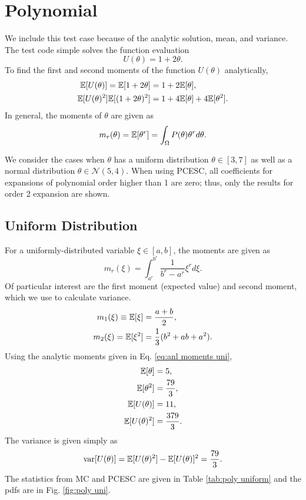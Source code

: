 \section{Polynomial}
We include this test case because of the analytic solution, mean, and variance.  The test code simple solves the function evaluation
\begin{equation}
U(\theta) = 1+2\theta.
\end{equation}
To find the first and second moments of the function $U(\theta)$ analytically,
\begin{align}
\mathbb{E}[ U(\theta)]=\mathbb{E}[ 1+2\theta]&=1+2\mathbb{E}[ \theta],\\
\mathbb{E}[ U(\theta)^2]\mathbb{E}[ (1+2\theta)^2]&=1+4\mathbb{E}[ \theta]+4\mathbb{E}[ \theta^2].
\end{align}
In general, the moments of $\theta$ are given as
\begin{equation}
m_r(\theta)=\mathbb{E}[ \theta^r]=\int_\Omega P(\theta)\theta^r d\theta.
\end{equation}

We consider the cases when $\theta$ has a uniform distribution $\theta\in[3,7]$ as well as a normal distribution $\theta\in\mathcal{N}(5,4)$.  When using PCESC, all coefficients for expansions of polynomial order higher than 1 are zero; thus, only the results for order 2 expansion are shown.

\subsection{Uniform Distribution}
For a uniformly-distributed variable $\xi\in[a,b]$, the moments are given as
\begin{equation}
m_r(\xi)=\int_{a^r}^{b^r} \frac{1}{b^r-a^r}\xi^r d\xi.
\end{equation}
Of particular interest are the first moment (expected value) and second moment, which we use to calculate variance.
\begin{align}\label{eq:anl moments uni}
m_1(\xi)\equiv\mathbb{E}[ \xi]&=\frac{a+b}{2},\\
m_2(\xi)=\mathbb{E}[ \xi^2]&=\frac{1}{3}(b^2+ab+a^2).
\end{align}
Using the analytic moments given in Eq. \ref{eq:anl moments uni},
\begin{align}
\mathbb{E}[ \theta] &= 5,\\
\mathbb{E}[ \theta^2]&=\frac{79}{3},\\
\mathbb{E}[ U(\theta)]&=11,\\
\mathbb{E}[ U(\theta)^2]&=\frac{379}{3}.
\end{align}
The variance is given simply as
\begin{equation}
\text{var}[U(\theta)]=\mathbb{E}[ U(\theta)^2]-\mathbb{E}[ U(\theta)]^2=\frac{79}{3}.
\end{equation}
The statistics from MC and PCESC are given in Table \ref{tab:poly uniform} and the pdfs are in Fig. \ref{fig:poly uni}.



